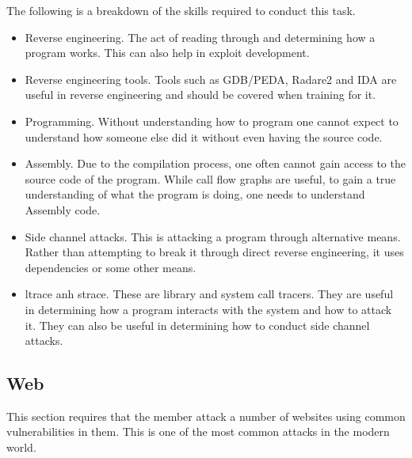 \documentclass[a4paper,11pt]{report}
\begin{document}
			The following is a breakdown of the skills required to conduct this task. 
			\begin{itemize}
				\item Reverse engineering. 
					The act of reading through and determining how a program works. 
					This can also help in exploit development. 
				\item Reverse engineering tools. 
					Tools such as GDB/PEDA, Radare2 and IDA are useful in reverse engineering and should be covered when training for it. 
				\item Programming. 
					Without understanding how to program one cannot expect to understand how someone else did it without even having the source code. 
				\item Assembly. 
					Due to the compilation process, one often cannot gain access to the source code of the program. 
					While call flow graphs are useful, to gain a true understanding of what the program is doing, one needs to understand Assembly code. 
				\item Side channel attacks. 
					This is attacking a program through alternative means. 
					Rather than attempting to break it through direct reverse engineering, it uses dependencies or some other means. 
				\item ltrace anh strace. 
					These are library and system call tracers. 
					They are useful in determining how a program interacts with the system and how to attack it. 
					They can also be useful in determining how to conduct side channel attacks. 
			\end{itemize}
		\subsection{Web}
			This section requires that the member attack a number of websites using common vulnerabilities in them. 
			This is one of the most common attacks in the modern world. 
\end{document}
